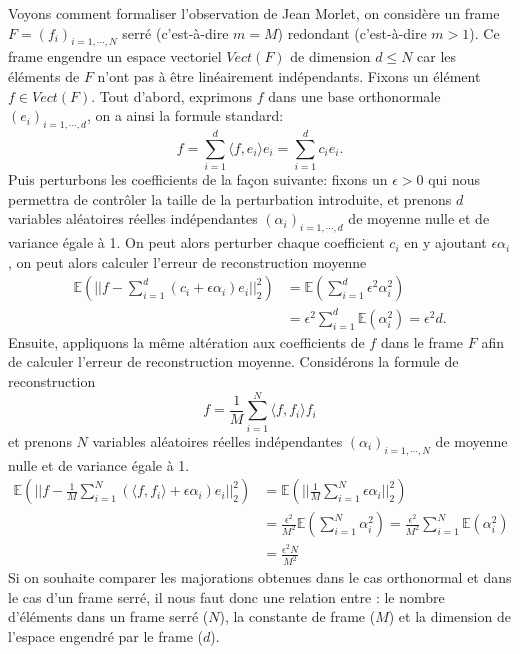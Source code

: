 Voyons comment formaliser l'observation de Jean Morlet, on considère un frame $F=(f_i)_{i=1,\cdots,N}$ serré (c'est-à-dire $m=M$) redondant (c'est-à-dire $m>1$).
Ce frame engendre un espace vectoriel $Vect(F)$ de dimension $d\leq N$ car les éléments de $F$ n'ont pas à être linéairement indépendants.
Fixons un élément $f\in Vect(F)$.
Tout d'abord, exprimons $f$ dans une base orthonormale $(e_i)_{i=1,\cdots, d}$, on a ainsi la formule standard:
\begin{equation*}
	f = \sum_{i=1}^d \langle f, e_i \rangle e_i = \sum_{i=1}^d c_i e_i.
\end{equation*}
Puis perturbons les coefficients de la façon suivante: fixons un $\epsilon >0$ qui nous permettra de contrôler la taille de la perturbation introduite, et prenons $d$ variables aléatoires réelles indépendantes $(\alpha_i)_{i=1,\cdots, d}$ de moyenne nulle et de variance égale à 1.
On peut alors perturber chaque coefficient $c_i$ en y ajoutant $\epsilon \alpha_i$, on peut alors calculer l'erreur de reconstruction moyenne
\begin{align*}
	\mathbb{E}\left(|| f- \sum_{i=1}^d (c_i + \epsilon \alpha_i)e_i||_2^2\right) &= \mathbb{E}\left(\sum_{i=1}^d \epsilon^2 \alpha_i^2\right)\\
		&= \epsilon^2 \sum_{i=1}^d \mathbb{E} (\alpha_i^2) = \epsilon^2 d \label{eq:errorth}.
\end{align*} 
Ensuite, appliquons la même altération aux coefficients de $f$ dans le frame $F$ afin de calculer l'erreur de reconstruction moyenne.
Considérons la formule de reconstruction
\begin{equation*}
	f = \frac{1}{M}\sum_{i=1}^N \langle f, f_i \rangle f_i
\end{equation*}
et prenons $N$ variables aléatoires réelles indépendantes $(\alpha_i)_{i=1, \cdots, N}$  de moyenne nulle et de variance égale à 1.
\begin{align}
	\mathbb{E}\left(|| f- \frac{1}{M}\sum_{i=1}^N (\langle f, f_i\rangle + \epsilon \alpha_i)e_i||_2^2\right) &= \mathbb{E}\left(||\frac{1}{M} \sum_{i=1}^N \epsilon \alpha_i||_2^2\right)\nonumber\\
	&= \frac{\epsilon^2}{M^2} \mathbb{E}(\sum_{i=1}^N \alpha_i^2) = \frac{\epsilon^2}{M^2} \sum_{i=1}^N \mathbb{E}(\alpha_i^2) \nonumber\\
	&= \frac{\epsilon^2 N}{M^2} \label{errframe}%
\end{align}
Si on souhaite comparer les majorations obtenues dans le cas orthonormal et dans le cas d'un frame serré, il nous faut donc une relation entre : le nombre d'éléments dans un frame serré ($N$), la constante de frame ($M$) et la dimension de l'espace engendré par le frame ($d$).
